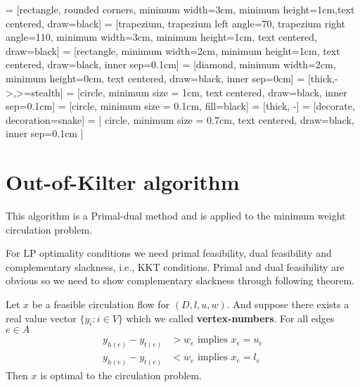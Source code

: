
\usepackage{subcaption}
\usepackage{makecell}

\usetikzlibrary{shapes.geometric, arrows}
     = [rectangle, rounded corners, minimum width=3cm, minimum height=1cm,text centered, draw=black]
     = [trapezium, trapezium left angle=70, trapezium right angle=110, minimum width=3cm, minimum height=1cm, text centered, draw=black]
     = [rectangle, minimum width=2cm, minimum height=1cm, text centered, draw=black, inner sep=0.1cm]
     = [diamond, minimum width=2cm, minimum height=0cm, text centered, draw=black, inner sep=0cm]
     = [thick,->,>=stealth]
     = [circle, minimum size = 1cm, text centered, draw=black, inner sep=0.1cm]
     = [circle, minimum size = 0.1cm, fill=black]
     = [thick, -]
     = [decorate, decoration={snake}]
     = [
        circle, 
        minimum size = 0.7cm, 
        text centered, 
        draw=black, 
        inner sep=0.1cm
    ]
\renewcommand{\docTitle}{Lecture 5 - Graph Algorithms}
\renewcommand{\docAuthor}{Lan Peng, Ph.D.}
\renewcommand{\docAffil}{School of Management, Shanghai University, Shanghai, China}


        \section{Out-of-Kilter algorithm}
            This algorithm is a Primal-dual method and is applied to the minimum weight circulation problem.

            For LP optimality conditions we need primal feasibility, dual feasibility and complementary slackness, i.e., KKT conditions. Primal and dual feasibility are obvious so we need to show complementary slackness through following theorem.

            \begin{theorem}
                Let $x$ be a feasible circulation flow for $(D, l, u, w)$. And suppose there exists a real value vector $\{y_i: i \in V\}$ which we called \textbf{vertex-numbers}. For all edges $e\in A$
                \begin{align}
                    y_{h(e)} - y_{t(e)} &> w_e \text{ implies } x_e = u_e\\
                    y_{h(e)} - y_{t(e)} &< w_e \text{ implies } x_e = l_e
                \end{align}
                Then $x$ is optimal to the circulation problem.
            \end{theorem}

